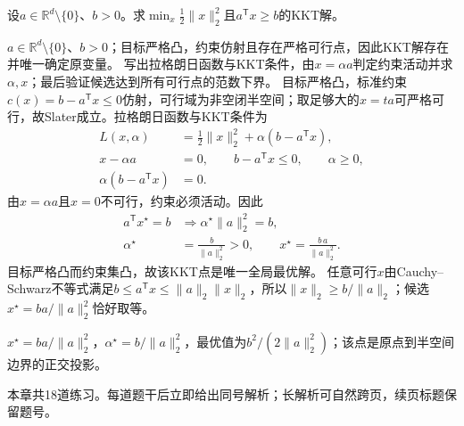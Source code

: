 \begin{example}[原点到半空间的KKT投影]\label{exm:V1-C07-halfspace-kkt}
设$a\in\mathbb R^d\setminus\{0\}$、$b>0$。求$\min_x\tfrac12\|x\|_2^2$且$a^{\mathsf T}x\ge b$的KKT解。
\end{example}
\begin{solution}
\SolGiven $a\in\mathbb R^d\setminus\{0\}$、$b>0$；目标严格凸，约束仿射且存在严格可行点，因此KKT解存在并唯一确定原变量。
\SolPlan 写出拉格朗日函数与KKT条件，由$x=\alpha a$判定约束活动并求$\alpha,x$；最后验证候选达到所有可行点的范数下界。
\SolDerive
目标严格凸，标准约束$c(x)=b-a^{\mathsf T}x\le0$仿射，可行域为非空闭半空间；取足够大的$x=ta$可严格可行，故Slater成立。拉格朗日函数与KKT条件为
\[
\begin{aligned}
L(x,\alpha)&=\frac12\|x\|_2^2+\alpha(b-a^{\mathsf T}x),\\
x-\alpha a&=0,\qquad
b-a^{\mathsf T}x\le0,\qquad
\alpha\ge0,\\
\alpha(b-a^{\mathsf T}x)&=0.
\end{aligned}
\]
由$x=\alpha a$且$x=0$不可行，约束必须活动。因此
\[
\begin{aligned}
a^{\mathsf T}x^\star=b
&\Longrightarrow \alpha^\star\|a\|_2^2=b,\\
\alpha^\star&=\frac{b}{\|a\|_2^2}>0,\qquad
x^\star=\frac{b\,a}{\|a\|_2^2}.
\end{aligned}
\]
目标严格凸而约束集凸，故该KKT点是唯一全局最优解。
\SolCheck 任意可行$x$由Cauchy--Schwarz不等式满足$b\le a^{\mathsf T}x\le\|a\|_2\|x\|_2$，所以$\|x\|_2\ge b/\|a\|_2$；候选$x^\star=ba/\|a\|_2^2$恰好取等。

\SolAnswer $x^\star=ba/\|a\|_2^2$，$\alpha^\star=b/\|a\|_2^2$，最优值为$b^2/(2\|a\|_2^2)$；该点是原点到半空间边界的正交投影。
\end{solution}

\begin{chapterexercisebox}
\label{struct:V1-C07-CH34}
\label{struct:V1-C07-CH35}
本章共18道练习。每道题干后立即给出同号解析；长解析可自然跨页，续页标题保留题号。
\end{chapterexercisebox}

